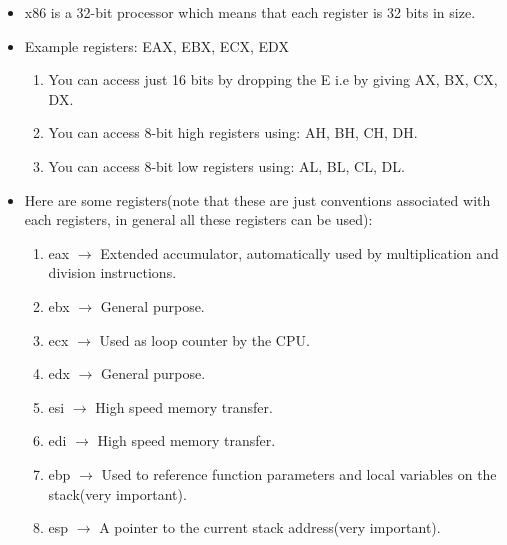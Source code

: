 \documentclass{article}
\makeatletter
\renewcommand\paragraph{\@startsection{paragraph}{4}{\z@}{-3.25ex \@plus -1ex \@minus -.2ex}{1.5ex \@plus .2ex}{\normalfont\normalsize\bfseries}}
\makeatother
\begin{document}
\paragraph{}
\begin{itemize}
\item x86 is a 32-bit processor which means that each register is 32 bits in size.
\item Example registers: EAX, EBX, ECX, EDX
\begin{enumerate}[label=$\bullet$]
\item You can access just 16 bits by dropping the E i.e by giving AX, BX, CX, DX.
\item You can access 8-bit high registers using: AH, BH, CH, DH.
\item You can access 8-bit low registers using: AL, BL, CL, DL.
\end{enumerate}
\item Here are some registers(note that these are just conventions associated with each registers, in general all these registers can be used):
\begin{enumerate}[label=$\bullet$]
\item eax $\rightarrow$ Extended accumulator, automatically used by multiplication and division instructions.
\item ebx $\rightarrow$ General purpose.
\item ecx $\rightarrow$ Used as loop counter by the CPU.
\item edx $\rightarrow$ General purpose.
\item esi $\rightarrow$ High speed memory transfer.
\item edi $\rightarrow$ High speed memory transfer.
\item ebp $\rightarrow$ Used to reference function parameters and local variables on the stack(very important).
\item esp $\rightarrow$ A pointer to the current stack address(very important).
\end{enumerate}
\end{itemize}

\newpage
\end{document}
